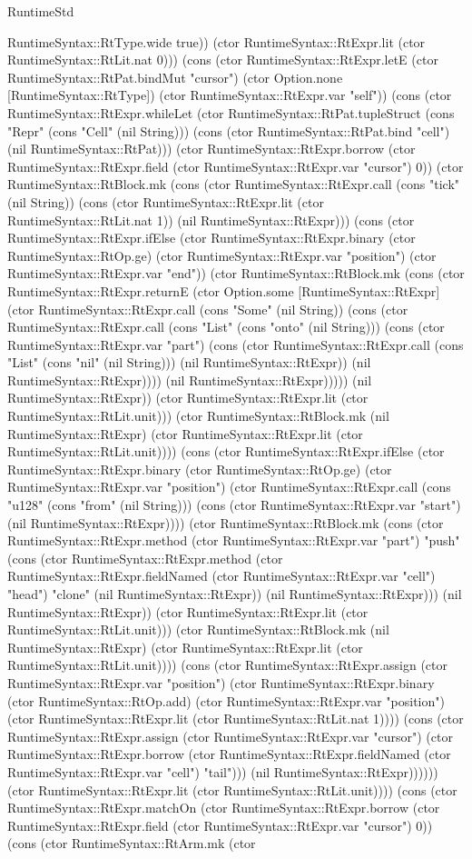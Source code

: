 \begin{lexlean}{RuntimeStd}
\begin{semanticmodule}
{RuntimeSyntax::RtType.wide true)) (ctor RuntimeSyntax::RtExpr.lit (ctor RuntimeSyntax::RtLit.nat 0))) (cons (ctor RuntimeSyntax::RtExpr.letE (ctor RuntimeSyntax::RtPat.bindMut "cursor") (ctor Option.none [RuntimeSyntax::RtType]) (ctor RuntimeSyntax::RtExpr.var "self")) (cons (ctor RuntimeSyntax::RtExpr.whileLet (ctor RuntimeSyntax::RtPat.tupleStruct (cons "Repr" (cons "Cell" (nil String))) (cons (ctor RuntimeSyntax::RtPat.bind "cell") (nil RuntimeSyntax::RtPat))) (ctor RuntimeSyntax::RtExpr.borrow (ctor RuntimeSyntax::RtExpr.field (ctor RuntimeSyntax::RtExpr.var "cursor") 0)) (ctor RuntimeSyntax::RtBlock.mk (cons (ctor RuntimeSyntax::RtExpr.call (cons "tick" (nil String)) (cons (ctor RuntimeSyntax::RtExpr.lit (ctor RuntimeSyntax::RtLit.nat 1)) (nil RuntimeSyntax::RtExpr))) (cons (ctor RuntimeSyntax::RtExpr.ifElse (ctor RuntimeSyntax::RtExpr.binary (ctor RuntimeSyntax::RtOp.ge) (ctor RuntimeSyntax::RtExpr.var "position") (ctor RuntimeSyntax::RtExpr.var "end")) (ctor RuntimeSyntax::RtBlock.mk (cons (ctor RuntimeSyntax::RtExpr.returnE (ctor Option.some [RuntimeSyntax::RtExpr] (ctor RuntimeSyntax::RtExpr.call (cons "Some" (nil String)) (cons (ctor RuntimeSyntax::RtExpr.call (cons "List" (cons "onto" (nil String))) (cons (ctor RuntimeSyntax::RtExpr.var "part") (cons (ctor RuntimeSyntax::RtExpr.call (cons "List" (cons "nil" (nil String))) (nil RuntimeSyntax::RtExpr)) (nil RuntimeSyntax::RtExpr)))) (nil RuntimeSyntax::RtExpr))))) (nil RuntimeSyntax::RtExpr)) (ctor RuntimeSyntax::RtExpr.lit (ctor RuntimeSyntax::RtLit.unit))) (ctor RuntimeSyntax::RtBlock.mk (nil RuntimeSyntax::RtExpr) (ctor RuntimeSyntax::RtExpr.lit (ctor RuntimeSyntax::RtLit.unit)))) (cons (ctor RuntimeSyntax::RtExpr.ifElse (ctor RuntimeSyntax::RtExpr.binary (ctor RuntimeSyntax::RtOp.ge) (ctor RuntimeSyntax::RtExpr.var "position") (ctor RuntimeSyntax::RtExpr.call (cons "u128" (cons "from" (nil String))) (cons (ctor RuntimeSyntax::RtExpr.var "start") (nil RuntimeSyntax::RtExpr)))) (ctor RuntimeSyntax::RtBlock.mk (cons (ctor RuntimeSyntax::RtExpr.method (ctor RuntimeSyntax::RtExpr.var "part") "push" (cons (ctor RuntimeSyntax::RtExpr.method (ctor RuntimeSyntax::RtExpr.fieldNamed (ctor RuntimeSyntax::RtExpr.var "cell") "head") "clone" (nil RuntimeSyntax::RtExpr)) (nil RuntimeSyntax::RtExpr))) (nil RuntimeSyntax::RtExpr)) (ctor RuntimeSyntax::RtExpr.lit (ctor RuntimeSyntax::RtLit.unit))) (ctor RuntimeSyntax::RtBlock.mk (nil RuntimeSyntax::RtExpr) (ctor RuntimeSyntax::RtExpr.lit (ctor RuntimeSyntax::RtLit.unit)))) (cons (ctor RuntimeSyntax::RtExpr.assign (ctor RuntimeSyntax::RtExpr.var "position") (ctor RuntimeSyntax::RtExpr.binary (ctor RuntimeSyntax::RtOp.add) (ctor RuntimeSyntax::RtExpr.var "position") (ctor RuntimeSyntax::RtExpr.lit (ctor RuntimeSyntax::RtLit.nat 1)))) (cons (ctor RuntimeSyntax::RtExpr.assign (ctor RuntimeSyntax::RtExpr.var "cursor") (ctor RuntimeSyntax::RtExpr.borrow (ctor RuntimeSyntax::RtExpr.fieldNamed (ctor RuntimeSyntax::RtExpr.var "cell") "tail"))) (nil RuntimeSyntax::RtExpr)))))) (ctor RuntimeSyntax::RtExpr.lit (ctor RuntimeSyntax::RtLit.unit)))) (cons (ctor RuntimeSyntax::RtExpr.matchOn (ctor RuntimeSyntax::RtExpr.borrow (ctor RuntimeSyntax::RtExpr.field (ctor RuntimeSyntax::RtExpr.var "cursor") 0)) (cons (ctor RuntimeSyntax::RtArm.mk (ctor }
\end{semanticmodule}
\end{lexlean}
